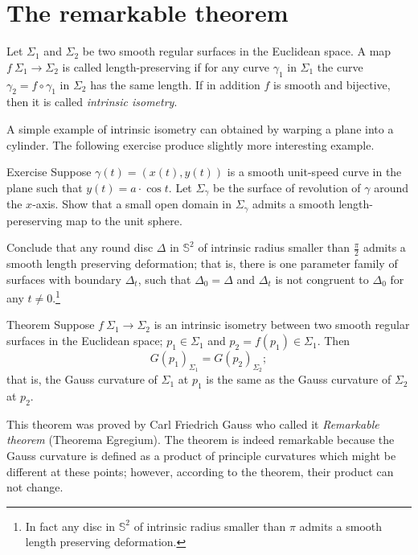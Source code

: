 \section*{The remarkable theorem}

Let $\Sigma_1$ and $\Sigma_2$ be two smooth regular surfaces in the Euclidean space.
A map $f\:\Sigma_1\to \Sigma_2$ is called  length-preserving if for any curve $\gamma_1$ in $\Sigma_1$ the curve $\gamma_2=f\circ\gamma_1$ in $\Sigma_2$ has the same length. %
If in addition $f$ is smooth and bijective, then it is called \emph{intrinsic isometry}. 

A simple example of intrinsic isometry can obtained by warping a plane into a cylinder.
The following exercise produce slightly more interesting example.

\begin{thm}{Exercise}\label{ex:deformation}
Suppose $\gamma(t)=(x(t),y(t))$ is a smooth unit-speed curve in the plane such that $y(t)=a\cdot \cos t$.
Let $\Sigma_\gamma$ be the surface of revolution of $\gamma$ around the $x$-axis.
Show that a small open domain in $\Sigma_\gamma$ admits a smooth length-pereserving map to the unit sphere.

Conclude that any round disc $\Delta$ in $\mathbb{S}^2$ of intrinsic radius smaller than $\tfrac\pi2$ admits a smooth length preserving deformation; that is, there is one parameter family of surfaces with boundary $\Delta_t$, such that $\Delta_0=\Delta$ and $\Delta_t$ is not congruent to $\Delta_0$ for any $t\ne0$.\footnote{In fact any disc in $\mathbb{S}^2$ of intrinsic radius smaller than $\pi$ admits a smooth length preserving deformation. %
}
\end{thm}


\begin{thm}{Theorem}\label{thm:remarkable}
Suppose $f\:\Sigma_1\to \Sigma_2$ is an intrinsic isometry between two smooth regular surfaces in  the Euclidean space; $p_1\in \Sigma_1$ and $p_2=f(p_1)\in \Sigma_1$.
Then 
\[G(p_1)_{\Sigma_1}=G(p_2)_{\Sigma_2};\]
that is, the Gauss curvature of $\Sigma_1$ at $p_1$ is the same as the Gauss curvature of $\Sigma_2$ at $p_2$.
\end{thm}

This theorem was proved by Carl Friedrich Gauss \cite{gauss} who called it \emph{Remarkable theorem} (Theorema Egregium).
The theorem is indeed remarkable because the Gauss curvature is defined as a product of principle curvatures which might be different at these points; however, according to the theorem, their product can not change.

